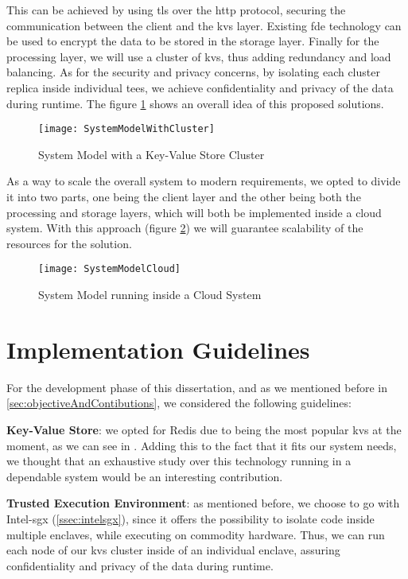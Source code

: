 This can be achieved by using \gls{tls} over the \gls{http} protocol, securing the communication between the client and the \gls{kvs} layer.  Existing \gls{fde} technology can be used to encrypt the data to be stored in the storage layer. Finally for the processing layer, we will use a cluster of \gls{kvs}, thus adding redundancy and load balancing. As for the security and privacy concerns, by isolating each cluster replica inside individual \gls{tee}s, we achieve confidentiality and privacy of the data during runtime. The figure \ref{fig:systemModelCluster} shows an overall idea of this proposed solutions.

\begin{figure}[htbp]
	\centering
	{\texttt{[image: SystemModelWithCluster]}}
	\caption{System Model with a Key-Value Store Cluster}
	\label{fig:systemModelCluster}
\end{figure}

As a way to scale the overall system to modern requirements, we opted to divide it into two parts, one being the client layer and the other being both the processing and storage layers, which will both be implemented inside a cloud system. With this approach (figure \ref{fig:systemModelCloud}) we will guarantee scalability of the resources for the solution.

\begin{figure}[htbp]
	\centering
	{\texttt{[image: SystemModelCloud]}}
	\caption{System Model running inside a Cloud System}
	\label{fig:systemModelCloud}
\end{figure}

\section{Implementation Guidelines} %

For the development phase of this dissertation, and as we mentioned before in \ref{sec:objectiveAndContibutions}, we considered the following guidelines:

\textbf{Key-Value Store}: we opted for Redis due to being the most popular \gls{kvs} at the moment, as we can see in \cite{rankingKVStores}. Adding this to the fact that it fits our system needs, we thought that an exhaustive study over this technology running in a dependable system would be an interesting contribution.

\textbf{Trusted Execution Environment}: as mentioned before, we choose to go with Intel-\gls{sgx} (\ref{ssec:intelsgx}), since it offers the possibility to isolate code inside multiple enclaves, while executing on commodity hardware. Thus, we can run each node of our \gls{kvs} cluster inside of an individual enclave, assuring confidentiality and privacy of the data during runtime.

